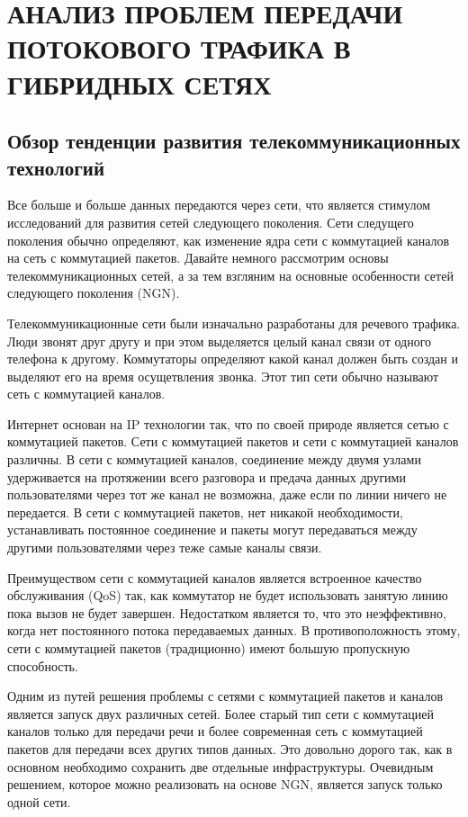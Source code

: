 \chapter[АНАЛИЗ \ ПРОБЛЕМ \ ПЕРЕДАЧИ \ ПОТОКОВОГО ТРАФИКА В ГИБРИДНЫХ СЕТЯХ]{АНАЛИЗ ПРОБЛЕМ ПЕРЕДАЧИ ПОТОКОВОГО ТРАФИКА В ГИБРИДНЫХ СЕТЯХ} \label{chapt1}


\section{Обзор тенденции развития телекоммуникационных технологий} \label{sect1_0}

Все больше и больше данных передаются через сети, что является стимулом исследований для развития сетей следующего поколения.
Сети следущего поколения обычно определяют, как изменение ядра сети с коммутацией каналов на сеть с коммутацией пакетов.
Давайте немного рассмотрим основы телекоммуникационных сетей, а за тем взгляним на основные особенности сетей следующего поколения (NGN).

Телекоммуникационные сети были изначально разработаны для речевого трафика. 
Люди звонят друг другу и при этом выделяется целый канал связи от одного телефона к другому. 
Коммутаторы определяют какой канал должен быть создан и выделяют его на время осущетвления звонка.
Этот тип сети обычно называют сеть с коммутацией каналов.

Интернет основан на IP технологии так, что по своей природе является сетью с коммутацией пакетов.
Сети с коммутацией пакетов и сети с коммутацией каналов различны.
В сети с коммутацией каналов, соединение между двумя узлами удерживается на протяжении всего разговора и предача данных другими пользователями через тот же канал не возможна, даже если по линии ничего не передается.
В сети с коммутацией пакетов, нет никакой необходимости, устанавливать постоянное соединение и пакеты могут передаваться между другими пользователями через теже самые каналы связи.

Преимуществом сети с коммутацией каналов является встроенное качество обслуживания (QoS) так, как коммутатор не будет использовать занятую линию пока вызов не будет завершен.
Недостатком является то, что это неэффективно, когда нет постоянного потока передаваемых данных.
В противоположность этому, сети с коммутацией пакетов (традиционно) имеют большую пропускную способность.

Одним из путей решения проблемы с сетями с коммутацией пакетов и каналов является запуск двух различных сетей. 
Более старый тип сети с коммутацией каналов только для передачи речи и более современная сеть с коммутацией пакетов для передачи всех других типов данных.
Это довольно дорого так, как в основном необходимо сохранить две отдельные инфраструктуры.
Очевидным решением, которое можно реализовать на основе NGN, является запуск только одной сети.


